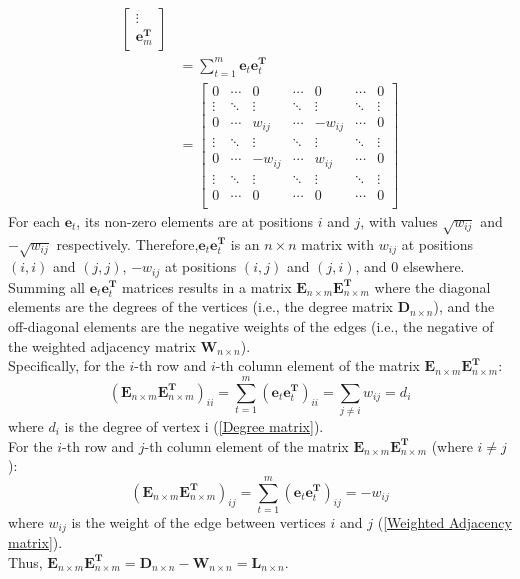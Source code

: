 \documentclass[oneside]{book}
\begin{document}
{{\begin{align}
\begin{bmatrix}
                    \vdots\\
                    \mathbf{e}_{m}^{\mathbf{T}}
                \end{bmatrix}\\
                &=\sum_{t=1}^{m}\mathbf{e}_{t}\mathbf{e}_{t}^{\mathbf{T}}\\
                &=
                \begin{bmatrix}
                    0      & \cdots & 0       & \cdots & 0       & \cdots & 0 \\
                    \vdots & \ddots & \vdots  & \ddots & \vdots  & \ddots & \vdots \\
                    0      & \cdots & w_{ij}  & \cdots & -w_{ij} & \cdots & 0 \\
                    \vdots & \ddots & \vdots  & \ddots & \vdots  & \ddots & \vdots \\
                    0      & \cdots & -w_{ij} & \cdots & w_{ij}  & \cdots & 0 \\
                    \vdots & \ddots & \vdots  & \ddots & \vdots  & \ddots & \vdots \\
                    0      & \cdots & 0       & \cdots & 0       & \cdots & 0 \\
                \end{bmatrix}
            \end{align}
        For each $\mathbf{e}_{t}$, its non-zero elements are at positions $i$ and $j$, with values $\sqrt{w_{ij}}$ and $-\sqrt{w_{ij}}$ respectively. Therefore,$\mathbf{e}_{t}\mathbf{e}_{t}^{\mathbf{T}}$ is an $n \times n$ matrix with $w_{ij}$ at positions $(i,i)$ and $(j,j)$, $-w_{ij}$ at positions $(i,j)$ and $(j,i)$, and 0 elsewhere.\\
        Summing all $\mathbf{e}_{t}\mathbf{e}_{t}^{\mathbf{T}}$ matrices results in a matrix $\mathbf{E}_{n \times m}\mathbf{E}_{n \times m}^{\mathbf{T}}$ where the diagonal elements are the degrees of the vertices (i.e., the degree matrix $\mathbf{D}_{n \times n}$), and the off-diagonal elements are the negative weights of the edges (i.e., the negative of the weighted adjacency matrix $\mathbf{W}_{n \times n}$).\\
        Specifically, for the $i$-th row and $i$-th column element of the matrix $\mathbf{E}_{n \times m}\mathbf{E}_{n \times m}^{\mathbf{T}}$:
        \[(\mathbf{E}_{n \times m}\mathbf{E}_{n \times m}^{\mathbf{T}})_{ii}=\sum_{t=1}^{m}(\mathbf{e}_{t}\mathbf{e}_{t}^{\mathbf{T}})_{ii}=\sum_{j \neq i}w_{ij}=d_{i}\]
        where $d_{i}$ is the degree of vertex i (\ref{Degree matrix}).\\
        For the $i$-th row and $j$-th column element of the matrix $\mathbf{E}_{n \times m}\mathbf{E}_{n \times m}^{\mathbf{T}}$ (where $i \neq j$):
        \[(\mathbf{E}_{n \times m}\mathbf{E}_{n \times m}^{\mathbf{T}})_{ij}=\sum_{t=1}^{m}(\mathbf{e}_{t}\mathbf{e}_{t}^{\mathbf{T}})_{ij}=-w_{ij}\]
        where $w_{ij}$ is the weight of the edge between vertices $i$ and $j$ (\ref{Weighted Adjacency matrix}).\\
        Thus, $\mathbf{E}_{n \times m}\mathbf{E}_{n \times m}^{\mathbf{T}}=\mathbf{D}_{n \times n}-\mathbf{W}_{n \times n}=\mathbf{L}_{n \times n}$.
    }
}
\end{document}
